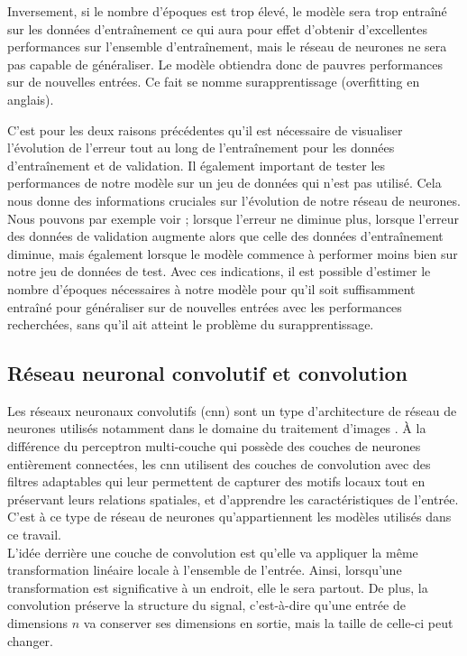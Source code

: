 Inversement, si le nombre d'époques est trop élevé, le modèle sera trop entraîné sur les données d'entraînement ce qui aura pour effet d'obtenir d'excellentes performances sur l'ensemble d'entraînement, mais le réseau de neurones ne sera pas capable de généraliser. Le modèle obtiendra donc de pauvres performances sur de nouvelles entrées. Ce fait se nomme surapprentissage (overfitting en anglais).

C'est pour les deux raisons précédentes qu'il est nécessaire de visualiser l'évolution de l'erreur tout au long de l'entraînement pour les données d'entraînement et de validation. Il également important de tester les performances de notre modèle sur un jeu de données qui n'est pas utilisé. Cela nous donne des informations cruciales sur l'évolution de notre réseau de neurones. Nous pouvons par exemple voir ; lorsque l'erreur ne diminue plus, lorsque l'erreur des données de validation augmente alors que celle des données d'entraînement diminue, mais également lorsque le modèle commence à performer moins bien sur notre jeu de données de test. Avec ces indications, il est possible d'estimer le nombre d'époques nécessaires à notre modèle pour qu'il soit suffisamment entraîné pour généraliser sur de nouvelles entrées avec les performances recherchées, sans qu'il ait atteint le problème du surapprentissage.

\subsection{Réseau neuronal convolutif et convolution}

Les réseaux neuronaux convolutifs (\acrshort{cnn}) sont un type d'architecture de réseau de neurones utilisés notamment dans le domaine du traitement d'images \cite{fleuret_deep_nodate-1}. À la différence du perceptron multi-couche qui possède des couches de neurones entièrement connectées, les \acrshort{cnn} utilisent des couches de convolution avec des filtres adaptables qui leur permettent de capturer des motifs locaux tout en préservant leurs relations spatiales, et d'apprendre les caractéristiques de l'entrée. C'est à ce type de réseau de neurones qu'appartiennent les modèles utilisés dans ce travail.\\

L'idée derrière une couche de convolution est qu'elle va appliquer la même transformation linéaire locale à l'ensemble de l'entrée. Ainsi, lorsqu'une transformation est significative à un endroit, elle le sera partout. De plus, la convolution préserve la structure du signal, c'est-à-dire qu'une entrée de dimensions $n$ va conserver ses dimensions en sortie, mais la taille de celle-ci peut changer.


